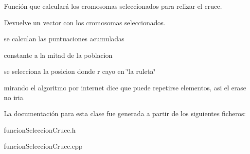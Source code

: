 Función que calculará los cromosomas seleccionados para relizar el cruce. 

\begin{DoxyReturn}{Devuelve}
un vector con los cromosomas seleccionados. 
\end{DoxyReturn}
se calculan las puntuaciones acumuladas

constante a la mitad de la poblacion

se selecciona la posicion donde r cayo en \char`\"{}la ruleta\char`\"{}

mirando el algoritmo por internet dice que puede repetirse elementos, asi el erase no iria 

La documentación para esta clase fue generada a partir de los siguientes ficheros\-:\begin{DoxyCompactItemize}
\item 
funcion\-Seleccion\-Cruce.\-h\item 
funcion\-Seleccion\-Cruce.\-cpp\end{DoxyCompactItemize}

